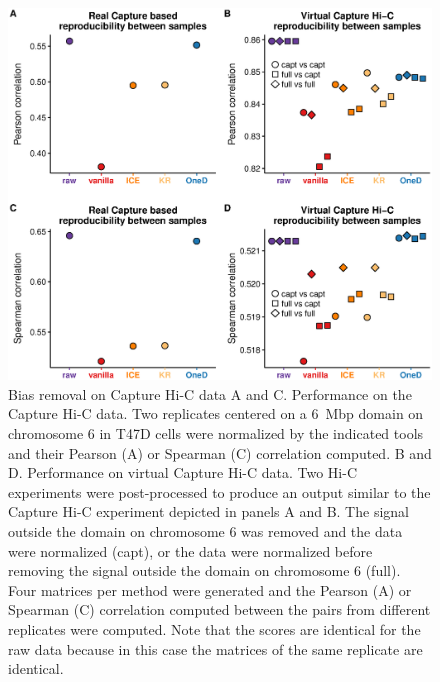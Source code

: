 \documentclass[12pt]{report}
\begin{document}
\begin{figure}
	\centerline{\includegraphics[width=\textwidth]{nar_figures/supp_figure_13.eps}}
    \caption{Bias removal on Capture Hi-C data A and C. Performance on the Capture
    Hi-C data. Two replicates centered on a 6~Mbp domain on chromosome 6 in
    T47D cells were normalized by the indicated tools and their
    Pearson (A) or Spearman (C) correlation computed. B and D. Performance on virtual
    Capture Hi-C  data. Two Hi-C experiments were post-processed to produce an output
    similar to the Capture Hi-C experiment depicted in panels A and B. The signal
    outside the domain on chromosome 6 was removed and the data were
    normalized (capt), or the data were normalized before removing the signal
    outside the domain on chromosome 6 (full). Four matrices per method were
    generated and the Pearson (A) or Spearman (C) correlation computed between the
    pairs from different replicates were computed. Note that the scores are identical
    for the raw data because in this case the matrices of the same replicate are
    identical.}
\end{figure}
\end{document}
